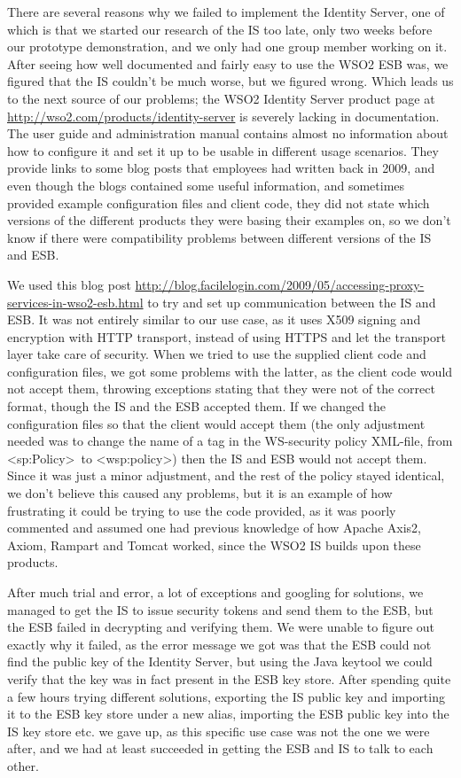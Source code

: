     There are several reasons why we failed to implement the Identity Server, one of which is that we started our research of the IS too late, only two weeks before our prototype demonstration, and we only had one group member working on it. After seeing how well documented and fairly easy to use the WSO2 ESB was, we figured that the IS couldn't be much worse, but we figured wrong. Which leads us to the next source of our problems; the WSO2 Identity Server product page at \url{http://wso2.com/products/identity-server} is severely lacking in documentation. The user guide and administration manual contains almost no information about how to configure it and set it up to be usable in different usage scenarios. They provide links to some blog posts that employees had written back in 2009, and even though the blogs contained some useful information, and sometimes provided example configuration files and client code, they did not state which versions of the different products they were basing their examples on, so 
we don't know if there were compatibility problems between different versions of the IS and ESB.

    We used this blog post \url{http://blog.facilelogin.com/2009/05/accessing-proxy-services-in-wso2-esb.html} to try and set up communication between the IS and ESB. It was not entirely similar to our use case, as it uses X509 signing and encryption with HTTP transport, instead of using HTTPS and let the transport layer take care of security. When we tried to use the supplied client code and configuration files, we got some problems with the latter, as the client code would not accept them, throwing exceptions stating that they were not of the correct format, though the IS and the ESB accepted them. If we changed the configuration files so that the client would accept them (the only adjustment needed was to change the name of a tag in the WS-security policy XML-file, from \textless sp:Policy\textgreater\ to \textless wsp:policy\textgreater) then the IS and ESB would not accept them. Since it was just a minor adjustment, and the rest of the policy stayed identical, we don't believe this caused any problems, 
but it is an example of how frustrating it could be trying to use the code provided, as it was poorly commented and assumed one had previous knowledge of how Apache Axis2, Axiom, Rampart and Tomcat worked, since the WSO2 IS builds upon these products.

    After much trial and error, a lot of exceptions and googling for solutions, we managed to get the IS to issue security tokens and send them to the ESB, but the ESB failed in decrypting and verifying them. We were unable to figure out exactly why it failed, as the error message we got was that the ESB could not find the public key of the Identity Server, but using the Java keytool we could verify that the key was in fact present in the ESB key store. After spending quite a few hours trying different solutions, exporting the IS public key and importing it to the ESB key store under a new alias, importing the ESB public key into the IS key store etc. we gave up, as this specific use case was not the one we were after, and we had at least succeeded in getting the ESB and IS to talk to each other.

